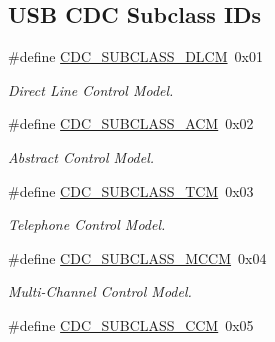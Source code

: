 \subsection*{U\-S\-B C\-D\-C Subclass I\-Ds}
\begin{DoxyCompactItemize}
\item 
\hypertarget{group__cdc__protocol__group_ga9d555a2c20cdda9166df1f1a0deb2fe6}{\#define \hyperlink{group__cdc__protocol__group_ga9d555a2c20cdda9166df1f1a0deb2fe6}{C\-D\-C\-\_\-\-S\-U\-B\-C\-L\-A\-S\-S\-\_\-\-D\-L\-C\-M}~0x01}\label{group__cdc__protocol__group_ga9d555a2c20cdda9166df1f1a0deb2fe6}

\begin{DoxyCompactList}\small\item\em Direct Line Control Model. \end{DoxyCompactList}\item 
\hypertarget{group__cdc__protocol__group_gacce3aedc4473cc5526efc16448b89221}{\#define \hyperlink{group__cdc__protocol__group_gacce3aedc4473cc5526efc16448b89221}{C\-D\-C\-\_\-\-S\-U\-B\-C\-L\-A\-S\-S\-\_\-\-A\-C\-M}~0x02}\label{group__cdc__protocol__group_gacce3aedc4473cc5526efc16448b89221}

\begin{DoxyCompactList}\small\item\em Abstract Control Model. \end{DoxyCompactList}\item 
\hypertarget{group__cdc__protocol__group_ga8e66107828e9b10a8b37823cb4436209}{\#define \hyperlink{group__cdc__protocol__group_ga8e66107828e9b10a8b37823cb4436209}{C\-D\-C\-\_\-\-S\-U\-B\-C\-L\-A\-S\-S\-\_\-\-T\-C\-M}~0x03}\label{group__cdc__protocol__group_ga8e66107828e9b10a8b37823cb4436209}

\begin{DoxyCompactList}\small\item\em Telephone Control Model. \end{DoxyCompactList}\item 
\hypertarget{group__cdc__protocol__group_ga279c0e93e9cf1c328e9551e62ebdc342}{\#define \hyperlink{group__cdc__protocol__group_ga279c0e93e9cf1c328e9551e62ebdc342}{C\-D\-C\-\_\-\-S\-U\-B\-C\-L\-A\-S\-S\-\_\-\-M\-C\-C\-M}~0x04}\label{group__cdc__protocol__group_ga279c0e93e9cf1c328e9551e62ebdc342}

\begin{DoxyCompactList}\small\item\em Multi-\/\-Channel Control Model. \end{DoxyCompactList}\item 
\hypertarget{group__cdc__protocol__group_gac03be4247341651b8a14fa4c57955bca}{\#define \hyperlink{group__cdc__protocol__group_gac03be4247341651b8a14fa4c57955bca}{C\-D\-C\-\_\-\-S\-U\-B\-C\-L\-A\-S\-S\-\_\-\-C\-C\-M}~0x05}\label{group__cdc__protocol__group_gac03be4247341651b8a14fa4c57955bca}


\end{DoxyCompactItemize}
